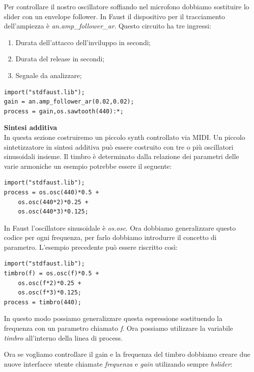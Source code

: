 \documentclass[11pt]{article}
\begin{document}
\begin{multicols*}{2}
Per controllare il nostro oscillatore soffiando nel microfono dobbiamo sostituire lo slider con un envelope follower. In Faust il dispositivo per il tracciamento dell'ampiezza è \textit{an.amp\_follower\_ar}. Questo circuito ha tre ingressi:

\begin{enumerate}
\item Durata dell'attacco dell'inviluppo in secondi; 
\item Durata del release in secondi; 
\item Segnale da analizzare;
\end{enumerate}

\begin{Verbatim}[fontsize=\footnotesize]
import("stdfaust.lib");
gain = an.amp_follower_ar(0.02,0.02);
process = gain,os.sawtooth(440):*;
\end{Verbatim}

\textbf{Sintesi additiva}\\

In questa sezione costruiremo un piccolo synth controllato via MIDI. Un piccolo sintetizzatore in sintesi additiva può essere costruito con tre o più oscillatori sinusoidali insieme. Il timbro è determinato dalla relazione dei parametri delle varie armoniche un esempio potrebbe essere il seguente:

\begin{Verbatim}[fontsize=\footnotesize]
import("stdfaust.lib");
process = os.osc(440)*0.5 + 
    os.osc(440*2)*0.25 + 
    os.osc(440*3)*0.125;
\end{Verbatim}

In Faust l'oscillatore sinusoidale è \textit{os.osc}. Ora dobbiamo generalizzare questo codice per ogni frequenza, per farlo dobbiamo introdurre il concetto di parametro. L'esempio precedente può essere riscritto così:

\begin{Verbatim}[fontsize=\footnotesize]
import("stdfaust.lib");
timbro(f) = os.osc(f)*0.5 + 
    os.osc(f*2)*0.25 + 
    os.osc(f*3)*0.125;
process = timbro(440);
\end{Verbatim}

In questo modo possiamo generalizzare questa espressione sostituendo la frequenza con un parametro chiamato \textit{f}. Ora possiamo utilizzare la variabile \textit{timbro} all'interno della linea di process.

Ora se vogliamo controllare il gain e la frequenza del timbro dobbiamo creare due nuove interfacce utente chiamate \textit{frequenza} e \textit{gain} utilizando sempre \textit{hslider}:


\end{multicols*}
\end{document}
